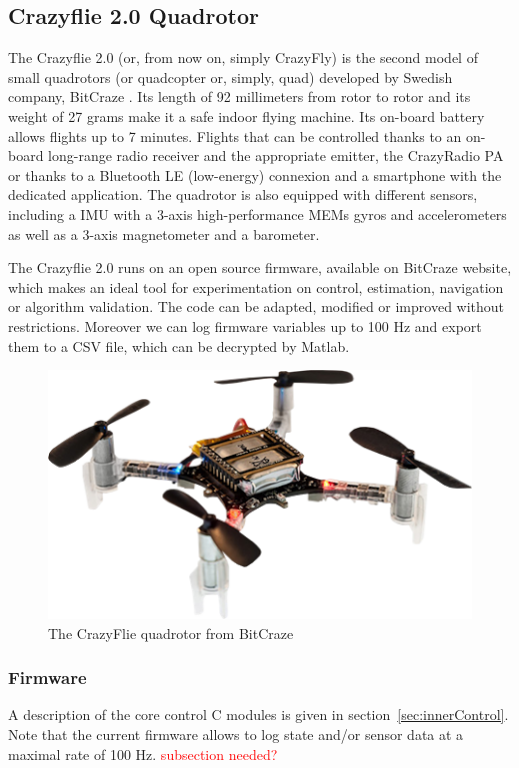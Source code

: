 \documentclass[a4paper, 12pt]{report}
\begin{document}
\subsection{Crazyflie 2.0 Quadrotor}
The Crazyflie 2.0 (or, from now on, simply CrazyFly) is the second model of small quadrotors (or quadcopter or, simply, quad) developed by Swedish company, BitCraze \cite{bitcraze}. Its length of 92 millimeters from rotor to rotor and its weight of 27 grams make it a safe indoor flying machine. Its on-board battery allows flights up to 7 minutes. Flights that can be controlled thanks to an on-board long-range radio receiver and the appropriate emitter, the CrazyRadio PA or thanks to a Bluetooth LE (low-energy) connexion and a smartphone with the dedicated application. The quadrotor is also equipped with different sensors, including a IMU with a 3-axis high-performance MEMs gyros and accelerometers as well as a 3-axis magnetometer and a barometer.

The Crazyflie 2.0 runs on an open source firmware, available on BitCraze website\cite{bitcraze}, which makes an ideal tool for experimentation on control, estimation, navigation or algorithm validation. The code can be adapted, modified or improved without restrictions. Moreover we can log firmware variables up to 100 Hz and export them to a CSV file, which can be decrypted by Matlab.

\begin{figure}[htbp]
\centering
\includegraphics[width=.4\textwidth]{Images/crazyflie}
\captionsetup[subfloat]{labelformat=empty}
\caption{The CrazyFlie quadrotor from BitCraze}
\label{fig:cf}
\end{figure}

\subsubsection{Firmware}
A description of the core control C modules is given in section~\ref{sec:innerControl}. Note that the current firmware allows to log state and/or sensor data at a maximal rate of 100 Hz. \textcolor{red}{subsection needed?}
\end{document}
